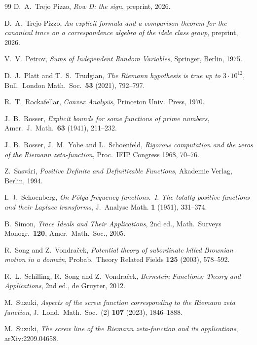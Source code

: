 \documentclass[11pt]{amsart}
\theoremstyle{definition}
\theoremstyle{remark}
\begin{document}
\begin{thebibliography}{99}
 D.~A.~Trejo Pizzo, \emph{Row D: the sign}, preprint, 2026.

 D.~A.~Trejo Pizzo, \emph{An explicit formula and a comparison theorem for the canonical trace on a correspondence
algebra of the idele class group}, preprint, 2026.

 V.~V.~Petrov, \emph{Sums of Independent Random Variables}, Springer, Berlin, 1975.

 D.~J.~Platt and T.~S.~Trudgian, \emph{The Riemann hypothesis is true up to
$3\cdot10^{12}$}, Bull.\ London Math.\ Soc.\ \textbf{53} (2021), 792--797.

 R.~T.~Rockafellar, \emph{Convex Analysis}, Princeton Univ.~Press, 1970.

 J.~B.~Rosser, \emph{Explicit bounds for some functions of prime numbers}, Amer.\ J.\
Math.\ \textbf{63} (1941), 211--232.

 J.~B.~Rosser, J.~M.~Yohe and L.~Schoenfeld, \emph{Rigorous computation and
the zeros of the Riemann zeta-function}, Proc.\ IFIP Congress 1968, 70--76.

 Z.~Sasv\'ari, \emph{Positive Definite and Definitizable Functions},
Akademie Verlag, Berlin, 1994.

 I.~J.~Schoenberg, \emph{On P\'olya frequency functions.~I. The
totally positive functions and their Laplace transforms}, J.~Analyse Math. \textbf{1} (1951), 331--374.

 B.~Simon, \emph{Trace Ideals and Their Applications}, 2nd ed., Math.\ Surveys Monogr.\ \textbf{120}, Amer.~Math.~Soc., 2005.

 R.~Song and Z.~Vondra\v{c}ek, \emph{Potential theory of subordinate
killed Brownian motion in a domain}, Probab.~Theory Related Fields \textbf{125} (2003), 578--592.

 R.~L.~Schilling, R.~Song and Z.~Vondra\v{c}ek, \emph{Bernstein Functions:
Theory and Applications}, 2nd ed., de Gruyter, 2012.

 M.~Suzuki, \emph{Aspects of the screw function corresponding to the
Riemann zeta function}, J.~Lond.~Math.~Soc.~(2) \textbf{107} (2023), 1846--1888.

 M.~Suzuki, \emph{The screw line of the Riemann zeta-function and
its applications}, arXiv:2209.04658.


\end{thebibliography}
\end{document}
